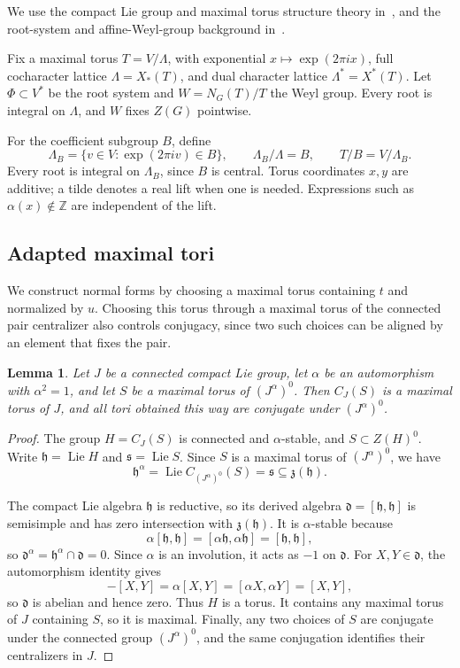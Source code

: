 \documentclass[11pt,a4paper,reqno]{amsart}
\theoremstyle{plain}
\newtheorem{lemma}[theorem]{Lemma}
\theoremstyle{definition}
\theoremstyle{remark}
\numberwithin{equation}{section}
\DeclareMathOperator{\Lie}{Lie}
\newcommand{\ZZ}{\mathbb Z}
\newcommand{\fh}{\mathfrak h}
\newcommand{\eexp}[1]{\exp(2\pi i #1)}
\begin{document}
We use the compact Lie group and maximal torus structure theory in~\cite[Ch.~IV--V]{brocker-tomdieck}, and the root-system and affine-Weyl-group background in~\cite[Ch.~IV--VI]{Bourbaki}.

Fix a maximal torus $T=V/\Lambda$, with exponential $x\mapsto\eexp{x}$, full cocharacter lattice $\Lambda=X_*(T)$, and dual character lattice $\Lambda^*=X^*(T)$. Let $\Phi\subset V^*$ be the root system and $W=N_G(T)/T$ the Weyl group. Every root is integral on $\Lambda$, and $W$ fixes $Z(G)$ pointwise.

For the coefficient subgroup $B$, define
\begin{equation}\label{eq:coefficientlattice}
\Lambda_B=\{v\in V:\eexp{v}\in B\},\qquad \Lambda_B/\Lambda=B,\qquad T/B=V/\Lambda_B.
\end{equation}
Every root is integral on $\Lambda_B$, since $B$ is central. Torus coordinates $x,y$ are additive; a tilde denotes a real lift when one is needed. Expressions such as $\alpha(x)\notin\ZZ$ are independent of the lift.

\subsection{Adapted maximal tori}

We construct normal forms by choosing a maximal torus containing $t$ and normalized by $u$. Choosing this torus through a maximal torus of the connected pair centralizer also controls conjugacy, since two such choices can be aligned by an element that fixes the pair.

\begin{lemma}\label{lem:adapted}
Let $J$ be a connected compact Lie group, let $\alpha$ be an automorphism with $\alpha^2=1$, and let $S$ be a maximal torus of $(J^\alpha)^0$. Then $C_J(S)$ is a maximal torus of $J$, and all tori obtained this way are conjugate under $(J^\alpha)^0$.
\end{lemma}
\begin{proof}
The group $H=C_J(S)$ is connected and $\alpha$-stable, and $S\subset Z(H)^0$. Write $\fh=\Lie H$ and $\mathfrak s=\Lie S$. Since $S$ is a maximal torus of $(J^\alpha)^0$, we have
\[
\fh^\alpha =\Lie C_{(J^\alpha)^0}(S) =\mathfrak s \subseteq\mathfrak z(\fh).
\]

The compact Lie algebra $\fh$ is reductive, so its derived algebra $\mathfrak d=[\fh,\fh]$ is semisimple and has zero intersection with $\mathfrak z(\fh)$. It is $\alpha$-stable because
\[
\alpha[\fh,\fh]=[\alpha\fh,\alpha\fh]=[\fh,\fh],
\]
so $\mathfrak d^\alpha=\fh^\alpha\cap\mathfrak d=0$. Since $\alpha$ is an involution, it acts as $-1$ on $\mathfrak d$. For $X,Y\in\mathfrak d$, the automorphism identity gives
\[
-[X,Y]=\alpha[X,Y]=[\alpha X,\alpha Y]=[X,Y],
\]
so $\mathfrak d$ is abelian and hence zero. Thus $H$ is a torus. It contains any maximal torus of $J$ containing $S$, so it is maximal. Finally, any two choices of $S$ are conjugate under the connected group $(J^\alpha)^0$, and the same conjugation identifies their centralizers in $J$.
\end{proof}
\end{document}
